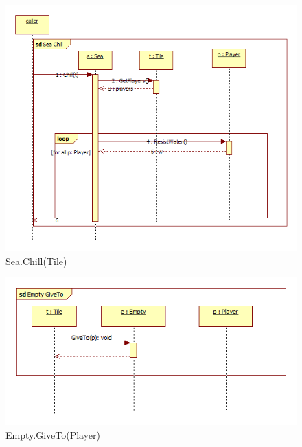 \begin{figure}[H]
	\begin{center}
		\includegraphics[width=13cm]{chapters/chapter04/seqdiag/Sea_Chill.png}
		\caption{Sea.Chill(Tile)}
		\label{fig:SeaChill}
	\end{center}
\end{figure}
\begin{figure}[H]
	\begin{center}
		\includegraphics[width=13cm]{chapters/chapter04/seqdiag/Empty_GiveTo.png}
		\caption{Empty.GiveTo(Player)}
		\label{fig:EmptyGiveTo}
	\end{center}
\end{figure}
